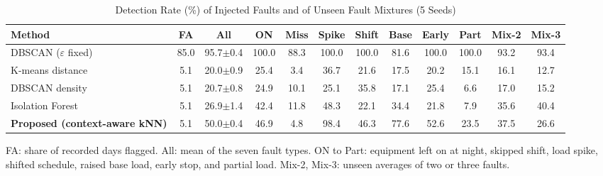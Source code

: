 \begin{table}[!t]
\caption{Detection Rate (\%) of Injected Faults and of Unseen Fault Mixtures (5 Seeds)}
\label{tab:anomaly}
\centering
\footnotesize
\setlength{\tabcolsep}{3.2pt}
\begin{tabular}{lccccccccccc}
\toprule
\textbf{Method} & \textbf{FA} & \textbf{All} & \textbf{ON} & \textbf{Miss} & \textbf{Spike} & \textbf{Shift} & \textbf{Base} & \textbf{Early} & \textbf{Part} & \textbf{Mix-2} & \textbf{Mix-3} \\
\midrule
DBSCAN ($\varepsilon$ fixed) & 85.0 & 95.7$\pm$0.4 & 100.0 & 88.3 & 100.0 & 100.0 & 81.6 & 100.0 & 100.0 & 93.2 & 93.4 \\
\midrule
K-means distance & 5.1 & 20.0$\pm$0.9 & 25.4 & 3.4 & 36.7 & 21.6 & 17.5 & 20.2 & 15.1 & 16.1 & 12.7 \\
DBSCAN density & 5.1 & 20.7$\pm$0.8 & 24.9 & 10.1 & 25.1 & 35.8 & 17.1 & 25.4 & 6.6 & 17.0 & 15.2 \\
Isolation Forest & 5.1 & 26.9$\pm$1.4 & 42.4 & 11.8 & 48.3 & 22.1 & 34.4 & 21.8 & 7.9 & 35.6 & 40.4 \\
\textbf{Proposed (context-aware kNN)} & 5.1 & 50.0$\pm$0.4 & 46.9 & 4.8 & 98.4 & 46.3 & 77.6 & 52.6 & 23.5 & 37.5 & 26.6 \\
\bottomrule
\end{tabular}
\par\vspace{2pt}\begin{minipage}{0.97\textwidth}\footnotesize FA: share of recorded days flagged. All: mean of the seven fault types. ON to Part: equipment left on at night, skipped shift, load spike, shifted schedule, raised base load, early stop, and partial load. Mix-2, Mix-3: unseen averages of two or three faults.\end{minipage}
\end{table}
